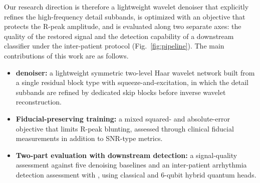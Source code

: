 Our research direction is therefore a lightweight wavelet denoiser that explicitly refines the high-frequency detail subbands, is optimized with an objective that protects the R-peak amplitude, and is evaluated along two separate axes: the quality of the restored signal and the detection capability of a downstream classifier under the inter-patient protocol (Fig.~\ref{fig:pipeline}). The main contributions of this work are as follows.
\begin{itemize}
    \item \textbf{\HSL{} denoiser:} a lightweight symmetric two-level Haar wavelet network built from a single residual block type with squeeze-and-excitation, in which the detail subbands are refined by dedicated skip blocks before inverse wavelet reconstruction.
    \item \textbf{Fiducial-preserving training:} a mixed squared- and absolute-error objective that limits R-peak blunting, assessed through clinical fiducial measurements in addition to SNR-type metrics.
    \item \textbf{Two-part evaluation with downstream detection:} a signal-quality assessment against five denoising baselines and an inter-patient arrhythmia detection assessment with \RRN{}, using classical and 6-qubit hybrid quantum heads.
\end{itemize}
